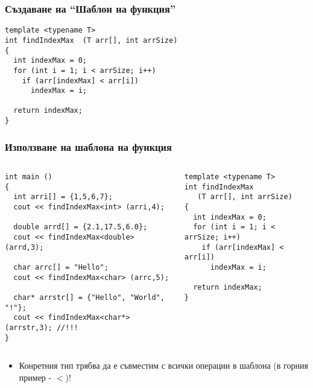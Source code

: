 \documentclass{beamer}
\begin{document}
\begin{frame}[fragile]
\frametitle{Създаване на ``Шаблон на функция''}


\begin{flushleft}
\begin{lstlisting}
template <typename T>
int findIndexMax  (T arr[], int arrSize)
{
  int indexMax = 0;
  for (int i = 1; i < arrSize; i++)
    if (arr[indexMax] < arr[i])
      indexMax = i;

  return indexMax;
}

\end{lstlisting}  
\end{flushleft}

\end{frame}


\begin{frame}[fragile]
\frametitle{Използване на шаблона на функция}

\begin{columns}[t]
  \begin{column}{0.6\textwidth}

\begin{flushleft}
\begin{lstlisting}
int main ()
{
  int arri[] = {1,5,6,7};
  cout << findIndexMax<int> (arri,4);

  double arrd[] = {2.1,17.5,6.0};
  cout << findIndexMax<double> (arrd,3);

  char arrc[] = "Hello";
  cout << findIndexMax<char> (arrc,5);

  char* arrstr[] = {"Hello", "World", "!"};
  cout << findIndexMax<char*> (arrstr,3); //!!!
}
\end{lstlisting}  
\end{flushleft}

  \end{column}
  \begin{column}{0.4\textwidth}

\begin{flushleft}
\begin{lstlisting}
template <typename T>
int findIndexMax  
   (T arr[], int arrSize)
{
  int indexMax = 0;
  for (int i = 1; i < arrSize; i++)
    if (arr[indexMax] < arr[i])
      indexMax = i;

  return indexMax;
}

\end{lstlisting}  
\end{flushleft}
  \end{column}
\end{columns}

\begin{itemize}
  \item Конретния тип трябва да е съвместим с всички операции в шаблона (в горния пример - $<$)!
\end{itemize}

\end{frame}
\end{document}
